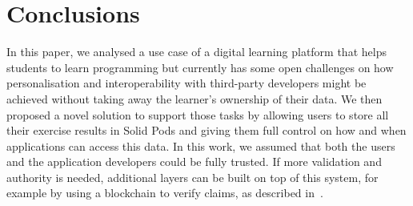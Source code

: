 \section{Conclusions}
In this paper, we analysed a use case of a digital learning platform that helps students to learn programming but currently has some open challenges on how personalisation and interoperability with third-party developers might be achieved without taking away the learner's ownership of their data. We then proposed a novel solution to support those tasks by allowing users to store all their exercise results in Solid Pods and giving them full control on how and when applications can access this data. In this work, we assumed that both the users and the application developers could be fully trusted. If more validation and authority is needed, additional layers can be built on top of this system, for example by using a blockchain to verify claims, as described in~\cite{chowdhury2020towards, mikroyannidis2020blockchain}.
